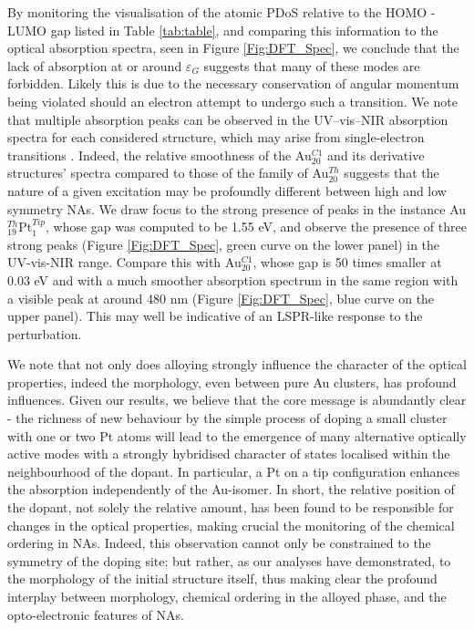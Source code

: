 By monitoring the visualisation of the atomic PDoS relative to the HOMO - LUMO gap listed in Table \ref{tab:table}, and comparing this information to the optical absorption spectra, seen in Figure \ref{Fig:DFT_Spec}, we conclude that the lack of absorption at or around $\varepsilon_{G}$ suggests that many of these modes are forbidden. Likely this is due to the necessary conservation of angular momentum being violated should an electron attempt to undergo such a  transition. We note that multiple absorption peaks can be observed in the UV–vis–NIR absorption spectra for each considered structure, which may arise from single-electron transitions \cite{ThreeStages}. Indeed, the relative smoothness of the Au$_{20}^{C1}$ and its derivative structures' spectra compared to those of the family of Au$_{20}^{Th}$ suggests that the nature of a given excitation may be profoundly different between high and low symmetry NAs. We draw focus to the strong presence of peaks in the instance Au$_{19}^{Th}$Pt$_{1}^{Tip}$, whose gap was computed to be 1.55 eV, and observe the presence of three strong peaks (Figure \ref{Fig:DFT_Spec}, green curve on the lower panel) in the UV-vis-NIR range. Compare this with Au$_{20}^{C1}$, whose gap is 50 times smaller at 0.03 eV and with a much smoother absorption spectrum in the same region with a visible peak at around 480 nm (Figure \ref{Fig:DFT_Spec}, blue curve on the upper panel). This may well be indicative of an LSPR-like response to the perturbation.

We note that not only does alloying strongly influence the character of the optical properties, indeed the morphology, even between pure Au clusters, has profound influences. Given our results, we believe that the core message is abundantly clear - the richness of new behaviour by the simple process of doping a small cluster with one or two Pt atoms will lead to the emergence of many alternative optically active modes with a strongly hybridised character of states localised within the neighbourhood of the dopant. In particular, a Pt on a tip configuration enhances the absorption independently of the Au-isomer. In short, the relative position of the dopant, not solely the relative amount, has been found to be responsible for changes in the optical properties, making crucial the monitoring of the chemical ordering in NAs. Indeed, this observation cannot only be constrained to the symmetry of the doping site; but rather, as our analyses have demonstrated, to the morphology of the initial structure itself, thus making clear the profound interplay between morphology, chemical ordering in the alloyed phase, and the opto-electronic features of NAs.

